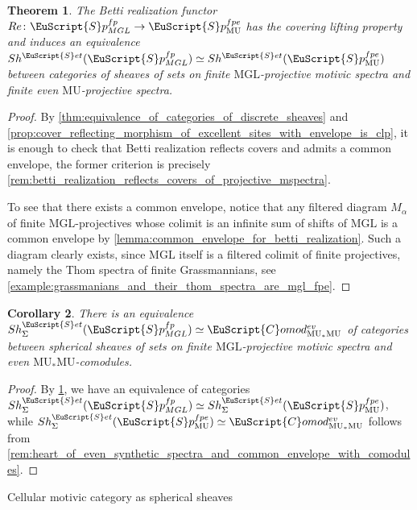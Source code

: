 \documentclass[oneside,a4paper]{amsart}
\makeatletter
\newcommand{\euscr}[1]{\EuScript{#1}} %
\newcommand{\MU}{\mathrm{MU}} %
\newcommand{\MGL}{\mathrm{MGL}} %
\newcommand{\spectra}{\euscr{S}p} %
\newcommand{\sets}{\euscr{S}et} %
\newcommand{\spectramglfp}{\spectra_{MGL}^{fp}} %
\newcommand{\spectramufpe}{\spectra_{\MU}^{fpe}} %
\newcommand{\Comod}{\euscr{C}omod} %
\newcommand{\ComodMU}{\Comod_{\MU_{*}\MU}} %
\theoremstyle{plain}
\newtheorem{thm}{Theorem}[section]
\newtheorem{cor}[thm]{Corollary}
\theoremstyle{definition}
\theoremstyle{remark}
\def\subsection{\@startsection{subsection}{1}%
  \z@{.7\linespacing\@plus\linespacing}{.5\linespacing}%
  {\normalfont\bfseries\centering}}%
\makeatother
\begin{document}
\begin{thm}
\label{thm:betti_realization_induces_a_coconontinous_right_adjoint_and_equivalence_on_sheaves_of_sets}
The Betti realization functor $Re \colon \spectramglfp \rightarrow \spectramufpe$ has the covering lifting property and induces an equivalence $Sh^{\sets}(\spectramglfp) \simeq Sh^{\sets}(\spectramufpe)$ between categories of sheaves of sets on finite $\MGL$-projective motivic spectra and finite even $\MU$-projective spectra. 
\end{thm}

\begin{proof}
By \cref{thm:equivalence_of_categories_of_discrete_sheaves} and \cref{prop:cover_reflecting_morphism_of_excellent_sites_with_envelope_is_clp}, it is enough to check that Betti realization reflects covers and admits a common envelope, the former criterion is precisely \cref{rem:betti_realization_reflects_covers_of_projective_mspectra}. 

To see that there exists a common envelope, notice that any filtered diagram $M_{\alpha}$ of finite $\MGL$-projectives whose colimit is an infinite sum of shifts of $\MGL$ is a common envelope by \cref{lemma:common_envelope_for_betti_realization}. Such a diagram clearly exists, since $\MGL$ itself is a filtered colimit of finite projectives, namely the Thom spectra of finite Grassmannians, see \cref{example:grassmanians_and_their_thom_spectra_are_mgl_fpe}. 
\end{proof}

\begin{cor}
\label{cor:spherical_sheaves_of_sets_on_spectramglfp_are_even_mumu_comodules}
There is an equivalence $Sh_{\Sigma}^{\sets}(\spectramglfp) \simeq \ComodMU^{ev}$ of categories between spherical sheaves of sets on finite $\MGL$-projective motivic spectra and even $\MU_{*}\MU$-comodules. 
\end{cor}

\begin{proof}
By \cref{thm:betti_realization_induces_a_coconontinous_right_adjoint_and_equivalence_on_sheaves_of_sets}, we have an equivalence of categories $Sh^{\sets}_{\Sigma}(\spectramglfp) \simeq Sh_{\Sigma}^{\sets}(\spectramufpe)$, while $Sh_{\Sigma}^{\sets}(\spectramufpe) \simeq \ComodMU^{ev}$ follows from \cref{rem:heart_of_even_synthetic_spectra_and_common_envelope_with_comodules}.
\end{proof}

\subsection{Cellular motivic category as spherical sheaves}
\label{subsection:cellular_motivic_cat_as_spherical_sheaves}
\end{document}
